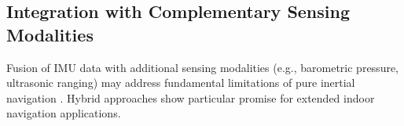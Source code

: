 \subsection{Integration with Complementary Sensing Modalities}
Fusion of IMU data with additional sensing modalities (e.g., barometric pressure, ultrasonic ranging) may address fundamental limitations of pure inertial navigation \cite{Bansal:2023}. Hybrid approaches show particular promise for extended indoor navigation applications.